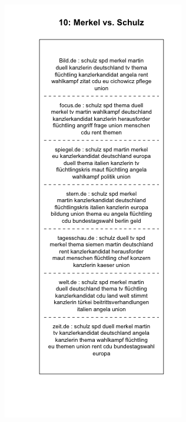 \documentclass[12pt,a4paper,notitlepage]{article}
\begin{document}
{\begin{figure}[H]
\begin{center}
\begin{subfigure}[normla]{0.49\textwidth}
		\end{subfigure}
		\begin{subfigure}[normla]{0.49\textwidth}
			\includegraphics[width=\textwidth]{../figs/plotquote10.png}
		\end{subfigure}
	\end{center}
\end{figure}

}
\end{document}
